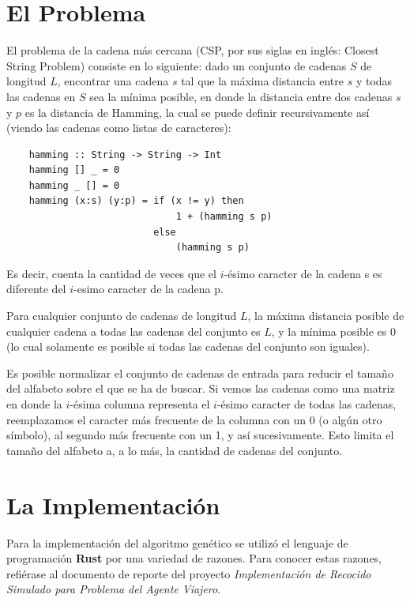 \documentclass{article}
\begin{document}
\section{El Problema}
  El problema de la cadena más cercana (CSP, por sus siglas en inglés: Closest String Problem) consiste
  en lo siguiente: dado un conjunto de cadenas $S$ de longitud $L$, encontrar una cadena $s$ tal que 
  la máxima distancia entre $s$ y todas las cadenas en $S$ sea la mínima posible, en donde la distancia 
  entre dos cadenas $s$ y $p$ es la distancia de Hamming, la cual se puede definir recursivamente 
  así (viendo las cadenas como listas de caracteres):
  \begin{lstlisting}
    hamming :: String -> String -> Int
    hamming [] _ = 0
    hamming _ [] = 0
    hamming (x:s) (y:p) = if (x != y) then 
                              1 + (hamming s p) 
                          else 
                              (hamming s p)
  \end{lstlisting}
  Es decir, cuenta la cantidad de veces que el $i$-ésimo caracter de la cadena s es diferente del $i$-esimo
  caracter de la cadena p.

  Para cualquier conjunto de cadenas de longitud $L$, la máxima distancia posible de cualquier cadena a todas 
  las cadenas del conjunto es $L$, y la mínima posible es 0 (lo cual solamente es posible si todas las 
  cadenas del conjunto son iguales).

  Es posible normalizar el conjunto de cadenas de entrada para reducir el tamaño del alfabeto sobre el que se ha
  de buscar. Si vemos las cadenas como una matriz en donde la $i$-ésima columna representa el $i$-ésimo caracter
  de todas las cadenas, reemplazamos el caracter más frecuente de la columna con un 0 (o algún otro símbolo), al segundo más
  frecuente con un 1, y así sucesivamente. Esto limita el tamaño del alfabeto a, a lo más, la cantidad de cadenas 
  del conjunto.

\section{La Implementación}
  Para la implementación del algoritmo genético se utilizó el lenguaje de programación \textbf{Rust} por una variedad
  de razones. Para conocer estas razones, refiérase al documento de reporte del proyecto \textit{Implementación de Recocido
  Simulado para Problema del Agente Viajero}.
\end{document}
